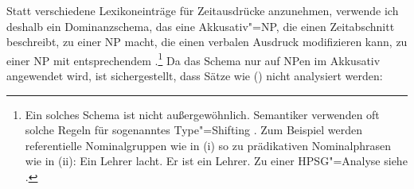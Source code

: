 Statt verschiedene Lexikoneinträge für Zeitausdrücke anzunehmen, verwende ich deshalb ein
Dominanzschema, das eine Akkusativ"=NP, die einen Zeitabschnitt beschreibt, zu einer NP macht, die
einen verbalen Ausdruck modifizieren kann, \dash zu einer NP mit entsprechendem \modw.\footnote{
  Ein solches Schema ist nicht außergewöhnlich. Semantiker verwenden oft solche Regeln für
  sogenanntes \mbox{Type}"=Shifting \citep{Partee86b-u}. Zum Beispiel werden referentielle Nominalgruppen
  wie in (i) so zu prädikativen Nominalphrasen wie in (ii):
  \eal
  \ex Ein Lehrer lacht.
  \ex Er ist ein Lehrer.
  \zl
  Zu einer HPSG"=Analyse siehe .
} Da das Schema
nur auf NPen im Akkusativ angewendet wird, ist sichergestellt, dass Sätze wie () nicht
analysiert werden: 
\eal 
{}
\zl
